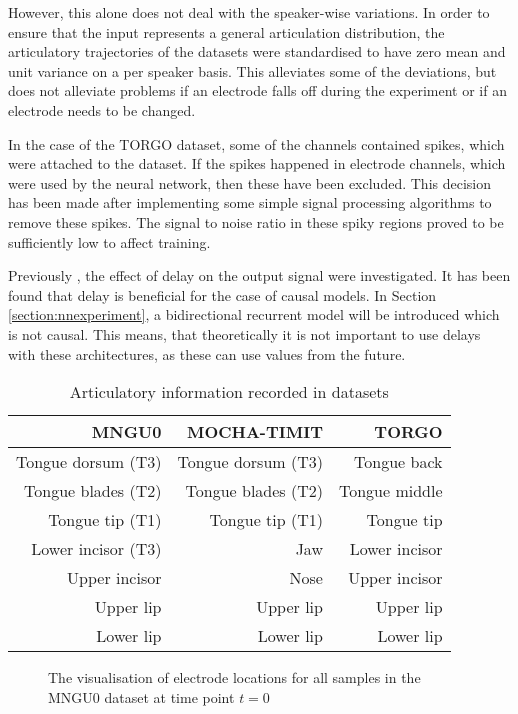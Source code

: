 \documentclass[a4paper]{article}
\begin{document}
However, this alone does not deal with the speaker-wise variations. In
order to ensure that the input represents a general articulation distribution,
the articulatory trajectories of the datasets were standardised to have
zero mean and unit variance on a per speaker basis. This alleviates some
of the deviations, but does not alleviate problems if an electrode
falls off during the experiment or if an electrode needs to be changed.

In the case of the TORGO dataset, some of the channels contained spikes, which
were attached to the dataset. If the spikes happened in electrode channels,
which were used by the neural network, then these have been excluded.
This decision has been made after implementing some simple signal
processing algorithms to remove these spikes. The signal to noise
ratio in these spiky regions proved to be sufficiently low to affect
training.

Previously \cite{Gonzalez2016}, the effect of delay on the
output signal were investigated. It has been found that delay
is beneficial for the case of causal models. In Section \ref{section:nnexperiment},
a bidirectional recurrent model will be introduced which is not causal. This means, that
theoretically it is not important to use delays with these architectures,
as these can use values from the future.

\begin{table}[th]
  \caption{Articulatory information recorded in datasets}
  \label{tab:electrodes}
  \centering
  \begin{tabular}{ r r r  }
    \toprule
    \textbf{MNGU0} & \textbf{MOCHA-TIMIT} & \textbf{TORGO} \\ 
    \midrule
    Tongue dorsum (T3) & Tongue dorsum (T3) & Tongue back \\
    Tongue blades (T2) & Tongue blades (T2) & Tongue middle \\
    Tongue tip (T1) & Tongue tip (T1) & Tongue tip \\
    Lower incisor (T3) & Jaw & Lower incisor\\
    Upper incisor & Nose & Upper incisor\\
    Upper lip & Upper lip & Upper lip \\
    Lower lip & Lower lip  & Lower lip\\
    \bottomrule
    \end{tabular}
\end{table}


\begin{figure}[t]
  \caption{The visualisation of electrode locations for all samples in
    the MNGU0 dataset at time point \( t = 0 \)}
  \label{fig:electrodes}
  \begin{center}
    \scalebox{0.50}{}
\end{center}
\end{figure}
\end{document}
